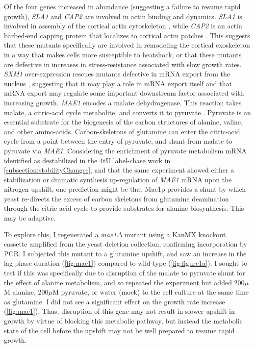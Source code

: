 Of the four genes increased in abundance (suggesting a failure to
resume rapid growth), \textit{SLA1} and
\textit{CAP2} are involved in actin binding and dynamics.
\textit{SLA1} is involved in assembly of the cortical actin
cytoskeleton \parencite{holtzman1993synthetic}, 
while \textit{CAP2} is an actin barbed-end
capping protein that localizes to cortical actin patches
\parencite{amatruda1990disruption}. 
This suggests that these mutants specifically are involved in
remodeling the cortical exoskeleton in a way that makes cells more
susceptible to heatshock, or that these mutants are defective in
increases in stress-resistance associated with slow growth rates.
\textit{SXM1} over-expression rescues mutants defective in mRNA export 
from the nucleus \parencite{seedorf1997importin}, suggesting that it
may play a role in mRNA export itself and that mRNA export may
regulate some important downstream factor associated with increasing
growth.
\textit{MAE1} encodes a malate dehydrogenase. This reaction takes
malate, a citric-acid cycle metabolite, and converts it to pyruvate
\parencite{boles1998identification}.
Pyruvate is an essential substrate for the
biogenesis of the carbon structures of alanine, valine, and other 
amino-acids.
Carbon-skeletons of glutamine can enter the citric-acid cycle from a
point between the entry of pyruvate, and shunt from malate to pyruvate
via \textit{MAE1}.
Considering the enrichment of pyruvate metabolism mRNA identified as 
destabilized in the 4tU label-chase work in 
\autoref{subsection:stabilityChanges}, and that the same experiment 
showed either a stabilization or dramatic synthesis up-regulation of 
\textit{MAE1} mRNA upon the nitrogen upshift, one prediction might 
be that Mae1p provides a shunt by which yeast re-directs the excess of
carbon skeletons from glutamine deamination through the citric-acid
cycle to provide substrates for alanine biosynthesis. This may be
adaptive.

To explore this, I regenerated a \textit{mae1}$\Delta$ mutant using
a KanMX knockout cassette amplified from the yeast deletion
collection, confirming incorporation by PCR. I subjected this mutant
to a glutamine upshift, and saw an increase in the lag-phase duration
(\autoref{fig:mae1})
compared to wild-type (\autoref{fig:figure1a}). I sought to test if this
was specifically due to disruption of the malate to pyruvate shunt for
the effect of alanine metabolism, and so repeated the experiment but
added 200$\mu$M alanine, 200$\mu$M pyruvate, or water (mock) to the 
cell culture at the same time as glutamine.
I did not see a significant effect on the growth rate increase
(\autoref{fig:mae1}).
Thus, disruption of this gene may not result in slower upshift in
growth by virtue of blocking this metabolic pathway, but instead the
metabolic state of the cell before the upshift may not be well 
prepared to resume rapid growth.

